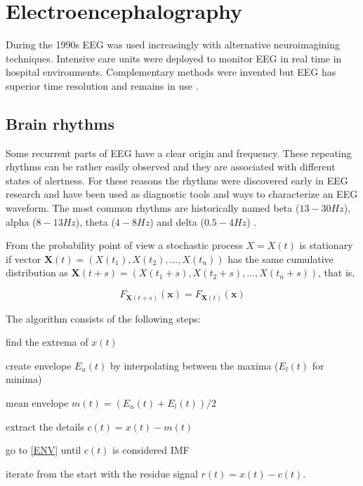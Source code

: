 \chapter{Electroencephalography}
\label{CHAPTER:EEG}

During the 1990s EEG was used increasingly with alternative neuroimagining techniques. Intensive care units were deployed to monitor EEG in real time in hospital environments. Complementary methods were invented but EEG has superior time resolution and remains in use \cite{LUCK2005, SWARTZ1998b}. 

\section{Brain rhythms}

Some recurrent parts of EEG have a clear origin and frequency. These repeating rhythms can be rather easily observed and they are associated with different states of alertness. For these reasons the rhythms were discovered early in EEG research and have been used as diagnostic tools and ways to characterize an EEG waveform. The most common rhythms are historically named beta ($13-30Hz$), alpha ($8-13Hz$), theta ($4-8Hz$) and delta ($0.5-4Hz$) \cite[pp. 10--12]{SANEI2007}. 


From the probability point of view a stochastic process $X=X(t)$ is stationary if vector $\mathbf{X}(t)=(X(t_1), X(t_2), \dots, X(t_n))$ has the same cumulative distribution as $\mathbf{X}(t+s)=(X(t_1+s),X(t_2+s),\dots,X(t_n+s))$, that is, 

\begin{equation}
F_{\mathbf{X}(t+s)}(\textbf{x}) = F_{\mathbf{X}(t)}(\textbf{x})
\label{CUM_DIST}
\end{equation}

The algorithm consists of the following steps: 

\begin{enumerate_no_space}
\item find the extrema of $x(t)$ \label{FIRST}
\item create envelope $E_u(t)$ by interpolating between the maxima ($E_l(t)$ for minima)\label{ENV}
\item mean envelope $m(t) = (E_u(t)+E_l(t))/2$
\item extract the details $c(t) = x(t) - m(t)$ \label{DETAIL}
\item go to \ref{ENV} until $c(t)$ is considered IMF \label{SIFT}
\item iterate from the start with the residue signal $r(t) = x(t) - c(t)$.
\end{enumerate_no_space}

